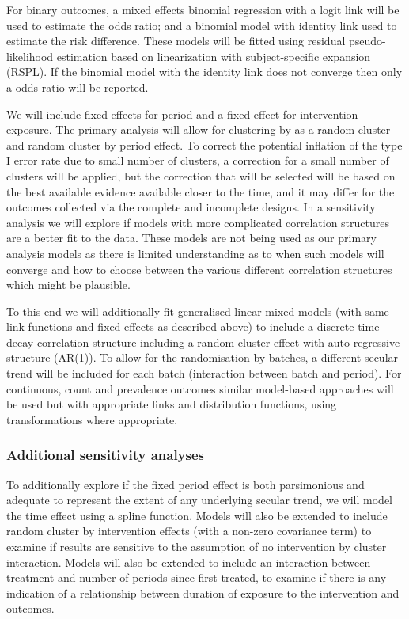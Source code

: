 \documentclass[
]{scrartcl}
\begin{document}
For binary outcomes, a mixed effects binomial regression with a logit
link will be used to estimate the odds ratio; and a binomial model with
identity link used to estimate the risk difference. These models will be
fitted using residual pseudo-likelihood estimation based on
linearization with subject-specific expansion (RSPL). If the binomial
model with the identity link does not converge then only a odds ratio
will be reported.

We will include fixed effects for period and a fixed effect for
intervention exposure. The primary analysis will allow for clustering by
as a random cluster and random cluster by period effect. To correct the
potential inflation of the type I error rate due to small number of
clusters, a correction for a small number of clusters will be applied,
but the correction that will be selected will be based on the best
available evidence available closer to the time, and it may differ for
the outcomes collected via the complete and incomplete designs. In a
sensitivity analysis we will explore if models with more complicated
correlation structures are a better fit to the data. These models are
not being used as our primary analysis models as there is limited
understanding as to when such models will converge and how to choose
between the various different correlation structures which might be
plausible.

To this end we will additionally fit generalised linear mixed models
(with same link functions and fixed effects as described above) to
include a discrete time decay correlation structure including a random
cluster effect with auto-regressive structure (AR(1)). To allow for the
randomisation by batches, a different secular trend will be included for
each batch (interaction between batch and period). For continuous, count
and prevalence outcomes similar model-based approaches will be used but
with appropriate links and distribution functions, using transformations
where appropriate.

\hypertarget{additional-sensitivity-analyses}{%
\subsubsection{Additional sensitivity
analyses}\label{additional-sensitivity-analyses}}

To additionally explore if the fixed period effect is both parsimonious
and adequate to represent the extent of any underlying secular trend, we
will model the time effect using a spline function. Models will also be
extended to include random cluster by intervention effects (with a
non-zero covariance term) to examine if results are sensitive to the
assumption of no intervention by cluster interaction. Models will also
be extended to include an interaction between treatment and number of
periods since first treated, to examine if there is any indication of a
relationship between duration of exposure to the intervention and
outcomes.
\end{document}
